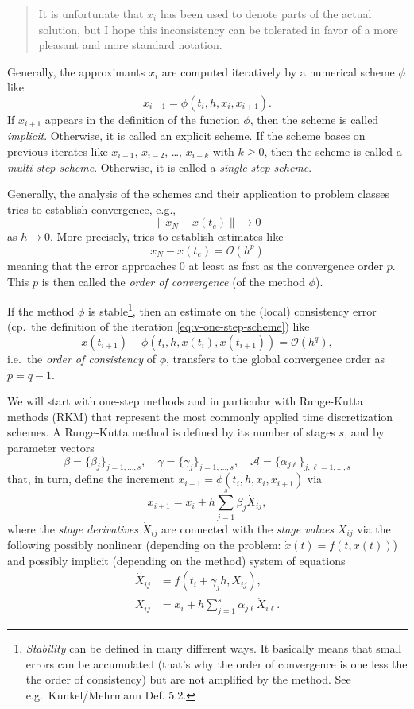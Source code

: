 \documentclass[]{book}
\newenvironment {JHSAYS} [0] {\begin{quote}\color{jhsc}} {\end{quote}}
\theoremstyle{definition}
\theoremstyle{definition}
\theoremstyle{definition}
\theoremstyle{definition}
\theoremstyle{remark}
\begin{document}
\begin{JHSAYS}
It is unfortunate that \(x_i\) has been used to denote parts of the actual solution, but I hope this inconsistency can be tolerated in favor of a more pleasant and more standard notation.
\end{JHSAYS}

Generally, the approximants \(x_i\) are computed iteratively by a numerical scheme \(\phi\) like
\[
x_{i+1} = \phi(t_i,h,x_i,x_{i+1}). \label{eq:v-one-step-scheme}
\]
If \(x_{i+1}\) appears in the definition of the function \(\phi\), then the scheme is called \emph{implicit}. Otherwise, it is called an explicit scheme. If the scheme bases on previous iterates like \(x_{i-1}\), \(x_{i-2}\), \ldots{}, \(x_{i-k}\) with \(k\geq 0\), then the scheme is called a \emph{multi-step scheme}. Otherwise, it is called a \emph{single-step scheme}.

Generally, the analysis of the schemes and their application to problem classes tries to establish convergence, e.g.,
\[
\|x_N - x(t_e)\| \to 0
\]
as \(h \to 0\). More precisely, tries to establish estimates like
\[
x_N - x(t_e) = \mathcal O(h^p)
\]
meaning that the error approaches \(0\) at least as fast as the convergence order \(p\). This \(p\) is then called the \emph{order of convergence} (of the method \(\phi\)).

If the method \(\phi\) is stable\footnote{\emph{Stability} can be defined in many different ways. It basically means that small errors can be accumulated (that's why the order of convergence is one less the the order of consistency) but are not amplified by the method. See e.g.~Kunkel/Mehrmann Def. 5.2.}, then an estimate on the (local) consistency error (cp.~the definition of the iteration \eqref{eq:v-one-step-scheme}) like
\[
x(t_{i+1}) - \phi(t_i, h, x(t_i), x(t_{i+1})) = \mathcal O(h^q),
\]
i.e.~the \emph{order of consistency} of \(\phi\), transfers to the global convergence order as \(p=q-1\).

We will start with one-step methods and in particular with Runge-Kutta methods (RKM) that represent the most commonly applied time discretization schemes. A Runge-Kutta method is defined by its number of stages \(s\), and by parameter vectors
\[
\beta = \{\beta_j\}_{j=1, \dotsc, s}, \quad \gamma=\{\gamma_j\}_{j=1,\dotsc,s}, \quad 
\mathcal A = \{\alpha_{j\ell}\}_{j,\ell=1, \dotsc, s}
\]
that, in turn, define the increment \(x_{i+1}=\phi(t_i,h,x_i,x_{i+1})\) via
\[
x_{i+1}=x_i+h\sum_{j=1}^s\beta_j \dot X_{ij},
\]
where the \emph{stage derivatives} \(\dot X_{ij}\) are connected with the \emph{stage values} \(X_{ij}\) via the following possibly nonlinear (depending on the problem: \(\dot x(t) = f(t,x(t))\)) and possibly implicit (depending on the method) system of equations
\begin{align}
\dot X_{ij} &= f(t_i+\gamma_jh, X_{ij}), \\
X_{ij} &= x_i + h \sum_{j=1}^s \alpha_{j\ell} \dot X_{i\ell}.
\end{align}
\end{document}
